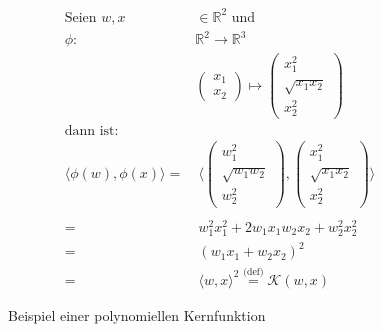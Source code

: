 \renewcommand{\figurename}{Bsp.}
\begin{figure}[htbp]
\begin{equation*}
\label{eq:svm_kernel_example}
\begin{split}
    \text{Seien } w,x & \in \mathbb{R}^2 \text{ und}\\
    \phi : & \mathbb{R}^2 \to \mathbb{R}^3\\
    & \begin{pmatrix}
    x_1 \\
    x_2
    \end{pmatrix}
    \mapsto
    \begin{pmatrix}
    x_1^2 \\
    \sqrt{x_1x_2} \\
    x_2^2
    \end{pmatrix}\\
    \text{dann ist:} &\\
    \langle \phi(w),\phi(x) \rangle = & \:\langle \begin{pmatrix}
    w_1^2 \\
    \sqrt{w_1w_2} \\
    w_2^2
    \end{pmatrix},
    \begin{pmatrix}
    x_1^2 \\
    \sqrt{x_1x_2} \\
    x_2^2
    \end{pmatrix} \rangle \\
    \\
    = & \:w_1^2x_1^2 + 2 w_1x_1w_2x_2 + w_2^2x_2^2 \\
    = & \:(w_1x_1 + w_2x_2)^2 \\
    = & \:\langle w,x \rangle^2 \overset{\text{(def)}}= \mathcal{K}(w,x)
\end{split}
\end{equation*}
    \caption{Beispiel einer polynomiellen Kernfunktion}
    \label{fig:ex_kernel}
\end{figure}
\renewcommand{\figurename}{Abb.}


